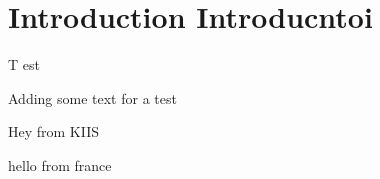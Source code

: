 

\section{Introduction Introducntoi}

\lettrine{T}{ }est
\lipsum


Adding some text for a test

Hey from KIIS

hello from france